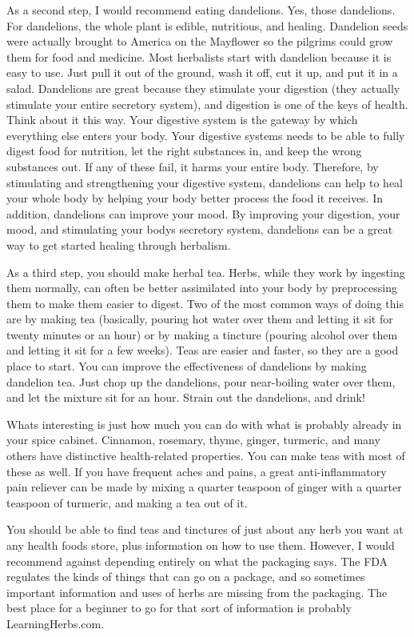 As a second step, I would recommend eating dandelions. Yes, those
dandelions. For dandelions, the whole plant is edible, nutritious, and
healing.  Dandelion seeds were actually brought to America on the
Mayflower so the pilgrims could grow them for food and medicine.  Most
herbalists start with dandelion because it is easy to use. Just pull it
out of the ground, wash it off, cut it up, and put it in a salad.
Dandelions are great because they stimulate your digestion (they
actually stimulate your entire secretory system), and digestion is one
of the keys of health. Think about it this way. Your digestive system
is the gateway by which everything else enters your body. Your
digestive systems needs to be able to fully digest food for nutrition,
let the right substances in, and keep the wrong substances out. If any
of these fail, it harms your entire body. Therefore, by stimulating and
strengthening your digestive system, dandelions can help to heal your
whole body by helping your body better process the food it receives. In
addition, dandelions can improve your mood. By improving your
digestion, your mood, and stimulating your body{\textquotesingle}s
secretory system, dandelions can be a great way to get started healing
through herbalism.

As a third step, you should make herbal tea. Herbs, while they work by
ingesting them normally, can often be better assimilated into your body
by preprocessing them to make them easier to digest. Two of the most
common ways of doing this are by making tea (basically, pouring hot
water over them and letting it sit for twenty minutes or an hour) or by
making a tincture (pouring alcohol over them and letting it sit for a
few weeks). Teas are easier and faster, so they are a good place to
start. You can improve the effectiveness of dandelions by making
dandelion tea. Just chop up the dandelions, pour near-boiling water
over them, and let the mixture sit for an hour. Strain out the
dandelions, and drink!  

What{\textquotesingle}s interesting is just how much you can do with
what is probably already in your spice cabinet. Cinnamon, rosemary,
thyme, ginger, turmeric, and many others have distinctive
health-related properties. You can make teas with most of these as
well. If you have frequent aches and pains, a great anti-inflammatory
pain reliever can be made by mixing a quarter teaspoon of ginger with a
quarter teaspoon of turmeric, and making a tea out of it.

You should be able to find teas and tinctures of just about any herb
you want at any health
foods store, plus information on how to use them. However, I would
recommend against depending entirely on what the packaging says. The
FDA regulates the kinds of things that can go on a package, and so
sometimes important information and uses of herbs are missing from the
packaging. The best place for a beginner to go for that sort of
information is probably LearningHerbs.com.

